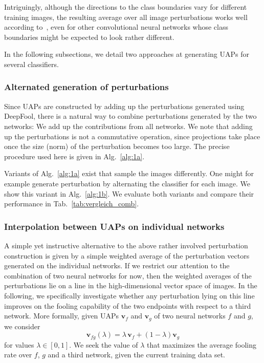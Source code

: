 \documentclass[runningheads]{llncs}
\begin{document}
Intriguingly, although the directions to the class boundaries vary for different training images, the resulting average over all image perturbations works well according to~\cite{moosavidezfooli_universal_2017}, even for other convolutional neural networks whose class boundaries might be expected to look rather different. 

In the following subsections, we detail two approaches at generating UAPs for several classifiers.

\subsubsection{Alternated generation of perturbations}
Since UAPs are constructed by adding up the perturbations generated using DeepFool, there is a natural way to combine perturbations generated by the two networks: We add up the contributions from all networks. We note that adding up the perturbations is not a commutative operation, since projections take place once the size (norm) of the perturbation becomes too large. The precise procedure used here is given in Alg.~\ref{alg:1a}. 

Variants of Alg.~\ref{alg:1a} exist that sample the images differently. One might for example generate perturbation by alternating the classifier for each image. We show this variant in Alg.~\ref{alg:1b}. We evaluate both variants and compare their performance in Tab.~\ref{tab:vergleich_comb}. 
 
\subsubsection{Interpolation between UAPs on individual networks}
A simple yet instructive alternative to the above rather involved perturbation construction is given by a simple weighted average of the perturbation vectors generated on the individual networks. If we restrict our attention to the combination of two neural networks for now, then the weighted averages of the perturbations lie on a line in the high-dimensional vector space of images. In the following, we specifically investigate whether any perturbation lying on this line improves on the fooling capability of the two endpoints with respect to a third network.
More formally, given UAPs \(\mathbf{v}_f\) and \(\mathbf{v}_g\) of two neural networks $f$ and $g$, we consider \begin{equation}\label{eq:interp}
\mathbf{v}_{fg}\left(\lambda\right)=\lambda\,\mathbf{v}_f+\left(1-\lambda\right)\mathbf{v}_g
\end{equation}	
for values \(\lambda\in\left[0,1\right]\). We seek the value of $\lambda$ that maximizes the average fooling rate over $f$, $g$ and a third network, given the current%
 training data set.
\end{document}
